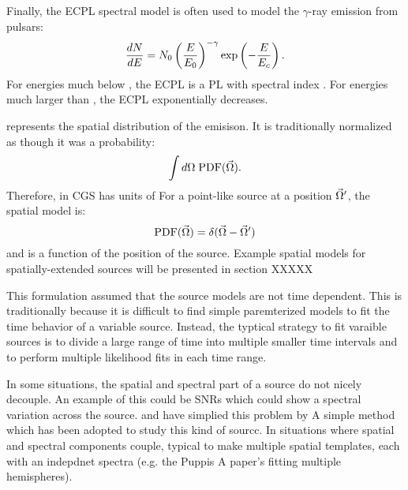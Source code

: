 Finally, the \ac{ECPL} spectral model is often
used to model the $\gamma$-ray emission from pulsars:
\begin{equation}
  \frac{dN}{dE} = N_0 \left(\frac{E}{E_0}\right)^{-\gamma}
  \exp\left(-\frac{E}{E_c}\right).
\end{equation}
For energies much below \Ecutoff, 
the \ac{ECPL} is a \ac{PL} with spectral index \spectralindex.
For energies much larger than \Ecutoff, the \ac{ECPL}
exponentially decreases.

\pdf represents the spatial distribution of the emisison.
It is traditionally normalized as though it was a probability:
  \begin{equation}
    \int d\Omega \; \text{PDF}(\vec\Omega).
  \end{equation}
Therefore, in \ac{CGS} \pdf has units of \pdfunits
For a point-like source at a position $\vec\Omega'$, the spatial model is:
  \begin{equation}
    \text{PDF}(\vec\Omega) = \delta(\vec\Omega - \vec\Omega')
  \end{equation}
and is a function of the position of the source.
Example spatial models for spatially-extended sources will be presented
in section XXXXX


This formulation assumed that the source models are not time dependent.
This is traditionally because it is difficult to find simple paremterized
models to fit the time behavior of a variable source. Instead, the typtical
strategy to fit varaible sources is to divide a large range of time
into multiple smaller time intervals 
and to perform multiple likelihood fits in each time range.

In some situations, the spatial and spectral part of a source do not nicely decouple.
An example of this could be \acp{SNR} which could show a spectral variation
across the source. 
\cite{s147_lat_katsuta_2012} and \cite{puppis_a_lat_hewitt_2012} have
simplied this problem by
A simple method which has been adopted to study
this kind of sourcc. 
In situations where spatial and spectral components couple, typical to make
multiple spatial templates, each with an indepdnet spectra (e.g. the Puppis A paper's
fitting multiple hemispheres).

